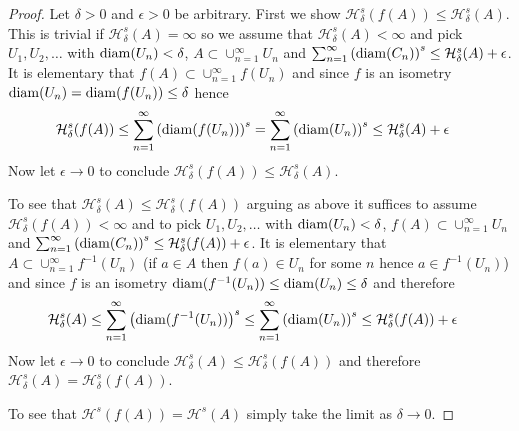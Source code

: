 \begin{proof}
Let $\delta>0$ and $\epsilon>0$ be arbitrary.  First we show $\mathcal{H}^s_\delta (f(A)) \leq \mathcal{H}^s_\delta(A)$.  This is trivial if $\mathcal{H}^s_\delta(A) =\infty$ so we assume that $\mathcal{H}^s_\delta(A) <\infty$ and pick $U_1, U_2, \dotsc$ with $\operatorname*{diam}(U_n) < \delta$, $A \subset \cup_{n=1}^\infty U_n$ and $\sum_{n=1}^\infty \left( \operatorname*{diam}(C_n) \right)^s \leq \mathcal{H}^s_\delta(A)+\epsilon$.  It is elementary that $f(A) \subset \cup_{n=1}^\infty f(U_n)$ and since $f$ is an isometry $\operatorname*{diam}(U_n) = \operatorname*{diam}(f(U_n)) \leq \delta$ hence
\begin{align*}
\mathcal{H}^s_\delta (f(A)) &\leq \sum_{n=1}^\infty \left( \operatorname*{diam}(f(U_n)) \right)^s = \sum_{n=1}^\infty \left( \operatorname*{diam}(U_n) \right)^s \leq \mathcal{H}^s_\delta(A)+\epsilon
\end{align*}
Now let $\epsilon \to 0$ to conclude $\mathcal{H}^s_\delta (f(A)) \leq \mathcal{H}^s_\delta(A)$.

To see that $\mathcal{H}^s_\delta(A) \leq \mathcal{H}^s_\delta (f(A))$ arguing as above it suffices to assume $\mathcal{H}^s_\delta (f(A)) < \infty$ and to pick $U_1, U_2, \dotsc$ with $\operatorname*{diam}(U_n) < \delta$, $f(A) \subset \cup_{n=1}^\infty U_n$ and $\sum_{n=1}^\infty \left( \operatorname*{diam}(C_n) \right)^s \leq \mathcal{H}^s_\delta(f(A))+\epsilon$.  It is elementary that $A \subset \cup_{n=1}^\infty f^{-1}(U_n)$ (if $a \in A$ then $f(a) \in U_n$ for some $n$ hence $a \in f^{-1}(U_n)$)
and since $f$ is an isometry $\operatorname*{diam}(f^{-1}(U_n)) \leq \operatorname*{diam}(U_n) \leq \delta$ and therefore
\begin{align*}
\mathcal{H}^s_\delta (A) &\leq \sum_{n=1}^\infty \left( \operatorname*{diam}(f^{-1}(U_n)) \right)^s \leq \sum_{n=1}^\infty \left( \operatorname*{diam}(U_n) \right)^s \leq \mathcal{H}^s_\delta(f(A))+\epsilon
\end{align*}
Now let $\epsilon \to 0$ to conclude $\mathcal{H}^s_\delta (A) \leq \mathcal{H}^s_\delta(f(A))$ and therefore $\mathcal{H}^s_\delta (A) = \mathcal{H}^s_\delta(f(A))$.
 
To see that $\mathcal{H}^s(f(A)) = \mathcal{H}^s(A)$ simply take the limit as $\delta \to 0$.
\end{proof}


